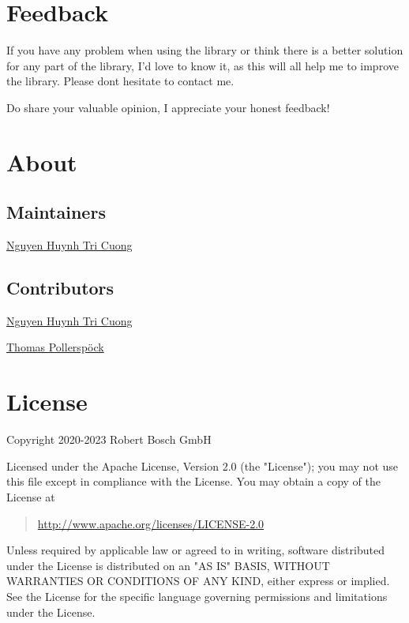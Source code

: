 \hypertarget{description-feedback}{%
\section{Feedback}\label{description-feedback}}

If you have any problem when using the library or think there is a
better solution for any part of the library, I'd love to know it, as
this will all help me to improve the library. Please
don\textquotesingle t hesitate to contact me.

Do share your valuable opinion, I appreciate your honest feedback!

\hypertarget{description-about}{%
\section{About}\label{description-about}}

\hypertarget{description-maintainers}{%
\subsection{Maintainers}\label{description-maintainers}}

\href{mailto:Cuong.NguyenHuynhTri@vn.bosch.com}{Nguyen Huynh Tri Cuong}

\hypertarget{description-contributors}{%
\subsection{Contributors}\label{description-contributors}}

\href{mailto:Cuong.NguyenHuynhTri@vn.bosch.com}{Nguyen Huynh Tri Cuong}

\href{mailto:Thomas.Pollerspoeck@de.bosch.com}{Thomas Pollerspöck}

\hypertarget{description-license}{%
\section{License}\label{description-license}}

Copyright 2020-2023 Robert Bosch GmbH

Licensed under the Apache License, Version 2.0 (the "License"); you may
not use this file except in compliance with the License. You may obtain
a copy of the License at

\begin{quote}
\url{http://www.apache.org/licenses/LICENSE-2.0}
\end{quote}

Unless required by applicable law or agreed to in writing, software
distributed under the License is distributed on an "AS IS" BASIS,
WITHOUT WARRANTIES OR CONDITIONS OF ANY KIND, either express or implied.
See the License for the specific language governing permissions and
limitations under the License.
